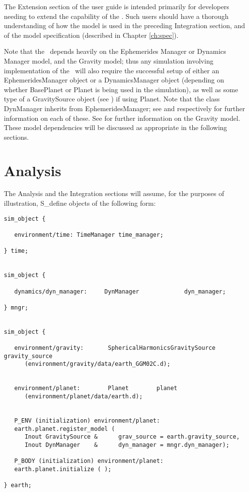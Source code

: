 The Extension section of the user guide is intended primarily for developers
needing to extend the capability of the \planetDesc.  Such users should have a
thorough understanding of how the model is used in the preceding Integration
section, and of the model specification (described in Chapter \ref{ch:spec}).

Note that the \planetDesc\ depends heavily on the Ephemerides Manager or
Dynamics Manager model, and the Gravity model; thus any simulation involving
implementation of the \planetDesc\ will also require the successful setup of
either an EphemeridesManager object or a DynamicsManager object (depending
on whether BasePlanet or Planet is being used in the simulation), as well as
some type of a GravitySource object (see \cite{dynenv:GRAVITY}) if using Planet.
 Note that the class DynManager inherits from EphemeridesManager; see
\cite{dynenv:DYNMANAGER} and \cite{dynenv:EPHEMERIDES} respectively for further
information on each of these. See \cite{dynenv:GRAVITY} for further information
on the Gravity model. These model dependencies will be discussed as appropriate
in the following sections.

\section{Analysis}

The Analysis and the Integration sections will assume, for the purposes of
illustration, S\_define objects of the following form:

\begin{verbatim}
sim_object {

   environment/time: TimeManager time_manager;

} time;


sim_object {

   dynamics/dyn_manager:     DynManager             dyn_manager;

} mngr;


sim_object { 

   environment/gravity:       SphericalHarmonicsGravitySource   gravity_source
      (environment/gravity/data/earth_GGM02C.d);


   environment/planet:        Planet        planet
      (environment/planet/data/earth.d);


   P_ENV (initialization) environment/planet:
   earth.planet.register_model (
      Inout GravitySource &      grav_source = earth.gravity_source,
      Inout DynManager    &      dyn_manager = mngr.dyn_manager);

   P_BODY (initialization) environment/planet:
   earth.planet.initialize ( );

} earth;
\end{verbatim}

